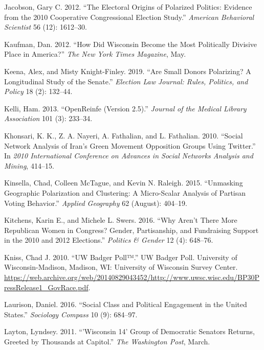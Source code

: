 \documentclass[12pt,]{article}
\begin{document}
\leavevmode\hypertarget{ref-jacobson2012}{}%
Jacobson, Gary C. 2012. ``The Electoral Origins of Polarized Politics:
Evidence from the 2010 Cooperative Congressional Election Study.''
\emph{American Behavioral Scientist} 56 (12): 1612--30.

\leavevmode\hypertarget{ref-kaufman2012}{}%
Kaufman, Dan. 2012. ``How Did Wisconsin Become the Most Politically
Divisive Place in America?'' \emph{The New York Times Magazine}, May.

\leavevmode\hypertarget{ref-keena2019}{}%
Keena, Alex, and Misty Knight-Finley. 2019. ``Are Small Donors
Polarizing? A Longitudinal Study of the Senate.'' \emph{Election Law
Journal: Rules, Politics, and Policy} 18 (2): 132--44.

\leavevmode\hypertarget{ref-openrefine}{}%
Kelli, Ham. 2013. ``OpenReinfe (Version 2.5).'' \emph{Journal of the
Medical Library Association} 101 (3): 233--34.

\leavevmode\hypertarget{ref-khonsari2010}{}%
Khonsari, K. K., Z. A. Nayeri, A. Fathalian, and L. Fathalian. 2010.
``Social Network Analysis of Iran's Green Movement Opposition Groups
Using Twitter.'' In \emph{2010 International Conference on Advances in
Social Networks Analysis and Mining}, 414--15.

\leavevmode\hypertarget{ref-kinsella2015}{}%
Kinsella, Chad, Colleen McTague, and Kevin N. Raleigh. 2015. ``Unmasking
Geographic Polarization and Clustering: A Micro-Scalar Analysis of
Partisan Voting Behavior.'' \emph{Applied Geography} 62 (August):
404--19.

\leavevmode\hypertarget{ref-kitchens2016}{}%
Kitchens, Karin E., and Michele L. Swers. 2016. ``Why Aren't There More
Republican Women in Congress? Gender, Partisanship, and Fundraising
Support in the 2010 and 2012 Elections.'' \emph{Politics \& Gender} 12
(4): 648--76.

\leavevmode\hypertarget{ref-uwsc}{}%
Kniss, Chad J. 2010. ``UW Badger Poll™.'' UW Badger Poll. University of
Wisconsin-Madison, Madison, WI: University of Wisconsin Survey Center.
\url{https://web.archive.org/web/20140829043452/http://www.uwsc.wisc.edu/BP30PressRelease1_GovRace.pdf}.

\leavevmode\hypertarget{ref-laurison2016}{}%
Laurison, Daniel. 2016. ``Social Class and Political Engagement in the
United States.'' \emph{Sociology Compass} 10 (9): 684--97.

\leavevmode\hypertarget{ref-layton2011}{}%
Layton, Lyndsey. 2011. ``'Wisconsin 14' Group of Democratic Senators
Returns, Greeted by Thousands at Capitol.'' \emph{The Washington Post},
March.
\end{document}
